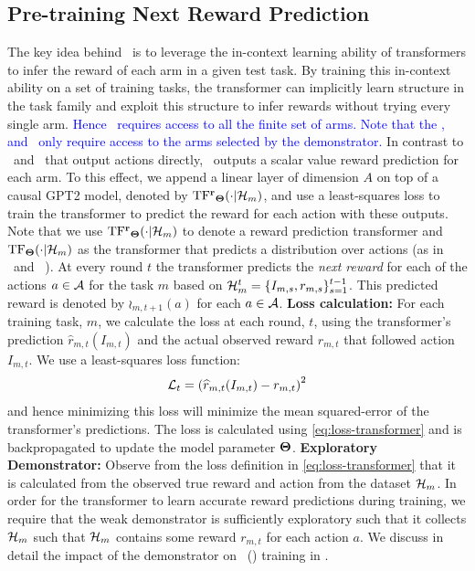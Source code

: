\documentclass[10pt]{article}
\theoremstyle{plain}
\theoremstyle{definition}
\theoremstyle{remark}
\begin{document}
\subsection{Pre-training Next Reward Prediction}
\label{sec:training}
\vspace*{-0.5em}
The key idea behind \pred\ is to leverage the in-context learning ability of transformers to infer the reward of each arm in a given test task.
By training this in-context ability on a set of training tasks, the transformer can implicitly learn structure in the task family and exploit this structure to infer rewards without trying every single arm.
\textcolor{blue}{Hence \pred\ requires access to all the finite set of arms. Note that the \ad, and \dpt\ only require access to the arms selected by the demonstrator.}
In contrast to \dpt\ and \ad\ that output actions directly, \pred\ outputs a scalar value reward prediction for each arm.
To this effect, we append a linear layer of dimension $A$ on top of a causal GPT2 model, denoted by $\mathrm{TF^{\mathbf{r}}}_{\mathbf{\Theta}}(\cdot | \mathcal{H}_m)$, and use a least-squares loss to train the transformer to predict the reward for each action with these outputs.
Note that we use $\mathrm{TF^{\mathbf{r}}}_{\mathbf{\Theta}}(\cdot | \mathcal{H}_m)$ to denote a reward prediction transformer and $\mathrm{TF}_{\mathbf{\Theta}}(\cdot | \mathcal{H}_m)$ as the transformer that predicts a distribution over actions (as in \dpt\ and \ad\ ).
At every round $t$ the transformer predicts the \emph{next reward} for each of the actions $a\in \mathcal{A}$ for the task $m$ based on $\mathcal{H}_m^t = \{I_{m,s}, r_{m,s}\}_{s=1}^{t-1}$. This predicted reward is denoted by $\wr_{m,t+1}(a)$ for each $a\in\mathcal{A}$.
\textbf{Loss calculation:} For each training task, $m$, we calculate the loss at each round, $t$, using the transformer's prediction $\hat{r}_{m,t}(I_{m,t})$ and the actual observed reward $r_{m,t}$ that followed action $I_{m,t}$.
We use a least-squares loss function:
\begin{align}
    \mathcal{L}_t = \left(\widehat{r}_{m,t}(I_{m, t}) -  r_{m,t}\right)^2 \label{eq:loss-transformer}
\end{align}
and hence minimizing this loss will minimize the mean squared-error of the transformer's predictions.
The loss is calculated using \eqref{eq:loss-transformer} and is backpropagated to update the model parameter $\mathbf{\Theta}$.
\textbf{Exploratory Demonstrator:} Observe from the loss definition in \eqref{eq:loss-transformer} that it is calculated from the observed true reward and action from the dataset $\mathcal{H}_m$.
In order for the transformer to learn accurate reward predictions during training, we require that the weak demonstrator is sufficiently exploratory such that it collects $\mathcal{H}_m$ such that $\mathcal{H}_m$ contains some reward $r_{m,t}$ for each action $a$. We discuss in detail the impact of the demonstrator on \pred\ (\gt) training in .
\vspace*{-0.5em}
\end{document}
